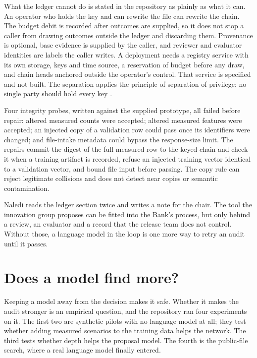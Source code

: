What the ledger cannot do is stated in the repository as plainly as what it can. An
operator who holds the key and can rewrite the file can rewrite the chain. The budget
debit is recorded after outcomes are supplied, so it does not stop a caller from
drawing outcomes outside the ledger and discarding them. Provenance is optional, base
evidence is supplied by the caller, and reviewer and evaluator identities are labels
the caller writes. A deployment needs a registry service with its own storage, keys
and time source, a reservation of budget before any draw, and chain heads anchored
outside the operator's control. That service is specified and not built.
The separation applies the principle of separation of privilege: no single party
should hold every key \citep{saltzer1975}.

Four integrity probes, written against the supplied prototype, all failed before
repair: altered measured counts were accepted; altered measured features were
accepted; an injected copy of a validation row could pass once its identifiers were
changed; and file-intake metadata could bypass the response-size limit. The repairs
commit the digest of the full measured row to the keyed chain and check it when a
training artifact is recorded, refuse an injected training vector identical to a
validation vector, and bound file input before parsing. The copy rule can reject
legitimate collisions and does not detect near copies or semantic contamination.

Naledi reads the ledger section twice and writes a note for the chair. The tool the
innovation group proposes can be fitted into the Bank's process, but only behind a
review, an evaluator and a record that the release team does not control. Without
those, a language model in the loop is one more way to retry an audit until it passes.

\section{Does a model find more?}\label{c14:sec-experiments}

Keeping a model away from the decision makes it safe. Whether it makes the audit
stronger is an empirical question, and the repository ran four experiments on it. The
first two are synthetic pilots with no language model at all; they test whether
adding measured scenarios to the training data helps the network. The third tests
whether depth helps the proposal model. The fourth is the public-file search, where a
real language model finally entered.


